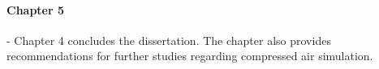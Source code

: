 	\paragraph{Chapter 5} \hspace{0.4cm} - \hspace{0.05cm} Chapter 4 concludes the dissertation. The chapter also provides recommendations for further studies regarding compressed air simulation.
